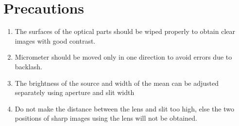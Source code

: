 \section{Precautions}
	\begin{enumerate}
		\item The surfaces of the optical parts should be wiped properly to obtain clear images with good contrast.
		\item Micrometer should be moved only in one direction to avoid errors due to backlash.
		\item The brightness of the source and width of the mean can be adjusted separately using aperture and slit width
		\item Do not make the distance between the lens and slit too high, else the two positions of sharp images using the lens will not be obtained.
	\end{enumerate}